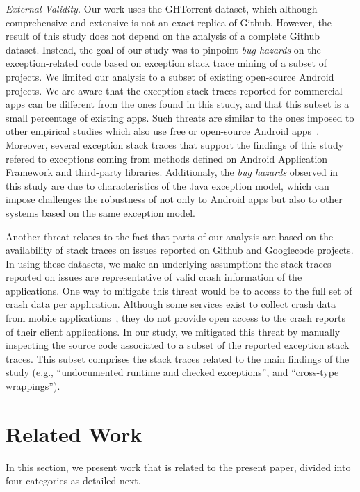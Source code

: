 \documentclass[conference]{IEEEtran}
\begin{document}
\emph{External Validity.} Our work uses the GHTorrent dataset, which although 
comprehensive and extensive is not an exact replica of Github. 
However, the result of this study does not depend on the analysis of
a complete Github dataset. Instead, the goal of our study was to 
pinpoint \emph{bug hazards} on the exception-related code based on 
exception stack trace mining of a subset of projects.
We limited our analysis to a subset of existing open-source Android projects.
We are aware that the exception stack traces reported 
for commercial apps can be different from the ones found in this study, and that
this subset is a small percentage of existing apps.
Such threats are similar to the ones imposed to other empirical studies 
which also use free or open-source Android apps~\cite{Linar13,McDon13,Ruiz12}.
Moreover, several exception stack traces that support the findings of this study
refered to exceptions coming from methods defined on Android Application Framework
and third-party libraries.  Additionaly,  the \emph{bug hazards} observed in this study are due to
characteristics of the Java exception model, which can impose challenges 
the robustness of not only to Android apps but also to other systems
 based on the same exception model. 

Another threat relates to the fact that parts of our analysis 
are based on the availability of stack traces on issues reported on Github and Googlecode projects. 
In using these datasets, we make an underlying assumption: the stack traces reported on issues are 
representative of valid crash information of the applications. 
One way to mitigate this threat would be to access to the full 
set of crash data per application. Although some services exist 
to collect crash data from mobile applications~\cite{BugSe14,BugSn14,Googl14,Acra14},
they do not provide open access to the crash reports of their client applications.
In our study, we mitigated this threat by manually inspecting
the source code associated to a subset of the reported exception stack traces.
This subset comprises the stack traces related to the main findings 
of the study (e.g., ``undocumented runtime and checked exceptions'',
and ``cross-type wrappings'').


\section{Related Work}
\label{sec:rele}

In this section, we present work that is related to the present paper, divided into
four categories as detailed next.
\end{document}
